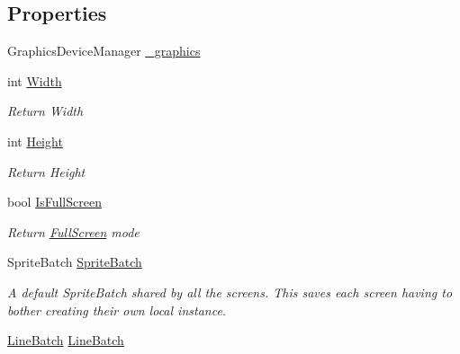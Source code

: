 \subsection*{Properties}
\begin{DoxyCompactItemize}
\item 
Graphics\+Device\+Manager \hyperlink{classgearit_1_1xna_1_1_screen_manager_af28162340e4c887907fccaf3c72ac340}{\+\_\+graphics}
\item 
int \hyperlink{classgearit_1_1xna_1_1_screen_manager_a439d024922ddd9906d16ed783167a4b5}{Width}
\begin{DoxyCompactList}\small\item\em Return Width \end{DoxyCompactList}\item 
int \hyperlink{classgearit_1_1xna_1_1_screen_manager_a382f8868d97c4a821d1cdee2d30c4937}{Height}
\begin{DoxyCompactList}\small\item\em Return Height \end{DoxyCompactList}\item 
bool \hyperlink{classgearit_1_1xna_1_1_screen_manager_a341ec68256be52aeccb85fdaf2569fa6}{Is\+Full\+Screen}
\begin{DoxyCompactList}\small\item\em Return \hyperlink{classgearit_1_1xna_1_1_full_screen}{Full\+Screen} mode \end{DoxyCompactList}\item 
Sprite\+Batch \hyperlink{classgearit_1_1xna_1_1_screen_manager_a64b3624f376229ed4c61df9cfa9b0e52}{Sprite\+Batch}
\begin{DoxyCompactList}\small\item\em A default Sprite\+Batch shared by all the screens. This saves each screen having to bother creating their own local instance. \end{DoxyCompactList}\item 
\hyperlink{classgearit_1_1xna_1_1_line_batch}{Line\+Batch} \hyperlink{classgearit_1_1xna_1_1_screen_manager_a1dd57d5058a07a9af6e619250d442ce2}{Line\+Batch}

\end{DoxyCompactItemize}
